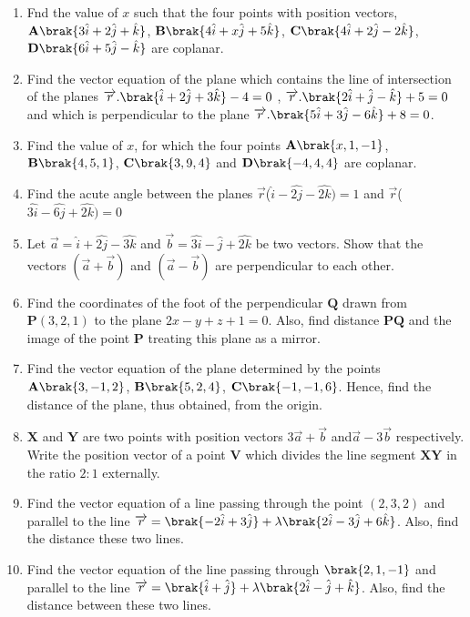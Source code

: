 \begin{enumerate}
\item Fnd the value of $x$ such that the four points with position vectors,
$\mathbf{A}\brak{3\hat{i} + 2\hat{j} + \hat{k}}$, $\mathbf{B}\brak{4\hat{i} + x\hat{j} + 5\hat{k}}$, $\mathbf{C}\brak{4\hat{i} + 2\hat{j} -2 \hat{k}}$, $\mathbf{D}\brak{6\hat{i} + 5\hat{j} - \hat{k}}$ are coplanar.
\item Find the vector equation of the plane which contains the line of intersection of the planes $ \overrightarrow{r}.\brak{\hat{i} + 2\hat{j}+3\hat{k}}-4=0$ , $\overrightarrow{r}.\brak{2\hat{i} + \hat{j} - \hat{k}}+5=0$ and which is perpendicular to the plane $\overrightarrow{r}.\brak{5\hat{i} + 3\hat{j} - 6\hat{k}}+8=0$.
\item Find the value of $x$, for which the four points $\mathbf{A}\brak{x,1,-1}$, $\mathbf{B}\brak{4,5,1}$, $\mathbf{C}\brak{3,9,4}$ and $\mathbf{D}\brak{-4,4,4}$ are coplanar.
\item Find the acute angle between the planes $\vec{r}$($ \hat{i}-\hat{2j}-\hat{2k})=1$ and $\vec{r}$($ \hat{3i}-\hat{6j}+\hat{2k})=0$
\item Let $\vec{a}=\hat{i}+\hat{2j}-\hat{3k}$ and $\vec{b}=\hat{3i}-\hat{j}+\hat{2k}$ be two vectors. Show that the vectors $(\vec{a}+\vec{b})$ and $(\vec{a}-\vec{b})$ are perpendicular to each other.
\item Find the coordinates of the foot of the perpendicular $\mathbf{Q}$ drawn from $\mathbf{P}(3, 2, 1)$ to the plane $2x - y + z + 1 = 0$. Also, find distance $\mathbf{PQ}$ and the image of the point $\mathbf{P}$ treating this plane as a mirror.
\item Find the vector equation of the plane determined by the points $\mathbf{A}\brak{3,-1,2}$, $\mathbf{B}\brak{5,2,4}$, $\mathbf{C}\brak{-1,-1,6}$. Hence, find the distance of the plane, thus obtained, from the origin.
\item $\mathbf{X}$ and $\mathbf{Y}$ are two points with position vectors $3\overrightarrow{a}+\overrightarrow{b}$ and$\overrightarrow{a}-3\overrightarrow{b}$ respectively. Write the position vector of a point $\mathbf{V}$ which divides the line segment $\mathbf{XY}$ in the ratio $2:1$ externally.
\item Find the vector equation of a line passing through the point $(2,3,2)$ and parallel to the line $\overrightarrow{r} = \brak{-2\hat{i}+3\hat{j}}+\lambda\brak{2\hat{i}-3\hat{j}+6\hat{k}}$. Also, find the distance these two lines.
\item  Find the vector equation of the line passing through $\brak{2, 1, -1}$ and parallel to the line $\overrightarrow{r}=\brak{\hat{i}+\hat{j}}+\lambda\brak{2\hat{i}-\hat{j}+\hat{k}}$. Also, find the distance between these two lines.


\end{enumerate}
